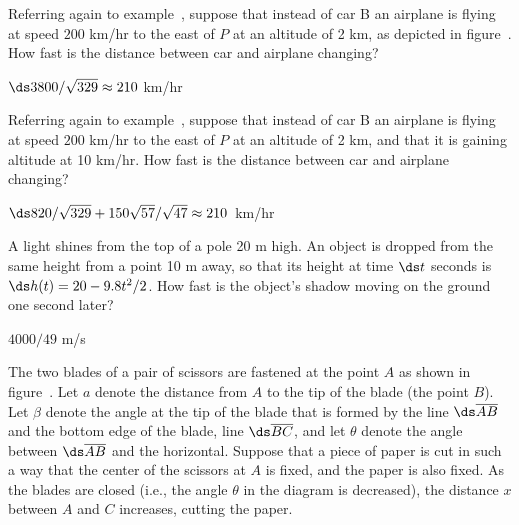 \begin{exercises}
\begin{exercise} Referring again to example~,
suppose that instead of car B an airplane is flying at speed $200$
km/hr to the east of $P$ at an altitude of 2 km, as depicted in
figure~. How fast is the distance between
car and airplane changing?  
\begin{answer} $\ds 3800/\sqrt{329}\approx 210$ km/hr 
\end{answer}\end{exercise}


\begin{exercise} Referring again to example~, suppose
that instead of car B an airplane is flying at speed $200$
km/hr to the east of $P$ at an altitude of 2 km, and that it is
gaining altitude at 10 km/hr.
How fast is
the distance between car and airplane changing?
\begin{answer} \hbox{$\ds 820/\sqrt{329}+150\sqrt{57}/\sqrt{47}\approx 210$ km/hr}
\end{answer}\end{exercise}

\begin{exercise}
A light shines from the top of a pole 20 m high.  An object is dropped from
the same height from a point 10 m away, so that its height at time $\ds t$
seconds is $\ds h(t)=20-9.8t^2/2$.  How fast is the object's shadow
moving on the ground one second later?
\begin{answer} $4000/49$ m/s
\end{answer}\end{exercise}

\begin{exercise}
The two blades of a pair of scissors are fastened at the point $A$ as
shown in figure~.  Let
$a$ denote the distance from $A$ to the tip of the blade (the point $B$).
Let $\beta$ denote the angle at the tip of the blade that is formed by the
line $\ds \overline{AB}$ and the bottom edge of the blade, line
$\ds \overline{BC}$, and let $\theta$ denote the angle between
$\ds \overline{AB}$ and the horizontal.
Suppose that a piece of paper is cut in such a way that the center
of the scissors at $A$ is fixed, and the paper is also fixed.  As the
blades are closed (i.e., the angle $\theta$ in the diagram is decreased),
the distance $x$ between $A$ and $C$ increases, cutting the paper.


\end{exercise}
\end{exercises}
